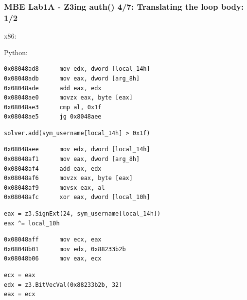 \documentclass[aspectratio=169]{beamer}
\begin{document}
\begin{frame}[fragile,t]
\frametitle{MBE Lab1A - Z3ing auth() 4/7: Translating the loop body: 1/2}
\begin{minipage}{0.5\textwidth}x86:\end{minipage}
\begin{minipage}{0.49\textwidth}Python:\end{minipage}
\begin{minipage}{0.5\textwidth}
\begin{Verbatim}[fontsize=\scriptsize, frame=single]
0x08048ad8      mov edx, dword [local_14h]
0x08048adb      mov eax, dword [arg_8h]
0x08048ade      add eax, edx
0x08048ae0      movzx eax, byte [eax]
0x08048ae3      cmp al, 0x1f
0x08048ae5      jg 0x8048aee
\end{Verbatim}
\end{minipage}
\begin{minipage}{0.49\textwidth}
\begin{Verbatim}[fontsize=\scriptsize, frame=single]
solver.add(sym_username[local_14h] > 0x1f)
\end{Verbatim}
\end{minipage}
\begin{minipage}{0.5\textwidth}
\begin{Verbatim}[fontsize=\scriptsize, frame=single]
0x08048aee      mov edx, dword [local_14h]
0x08048af1      mov eax, dword [arg_8h]
0x08048af4      add eax, edx
0x08048af6      movzx eax, byte [eax]
0x08048af9      movsx eax, al
0x08048afc      xor eax, dword [local_10h]
\end{Verbatim}
\end{minipage}
\begin{minipage}{0.49\textwidth}
\begin{Verbatim}[fontsize=\scriptsize, frame=single]
eax = z3.SignExt(24, sym_username[local_14h])
eax ^= local_10h
\end{Verbatim}
\end{minipage}
\begin{minipage}{0.5\textwidth}
\begin{Verbatim}[fontsize=\scriptsize, frame=single]
0x08048aff      mov ecx, eax
0x08048b01      mov edx, 0x88233b2b
0x08048b06      mov eax, ecx
\end{Verbatim}
\end{minipage}
\begin{minipage}{0.49\textwidth}
\begin{Verbatim}[fontsize=\scriptsize, frame=single]
ecx = eax
edx = z3.BitVecVal(0x88233b2b, 32)
eax = ecx
\end{Verbatim}
\end{minipage}
\end{frame}
\end{document}

